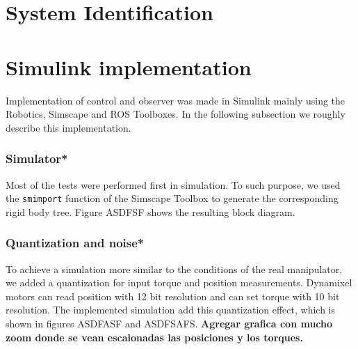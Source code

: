 \documentclass[a4paper, 10pt]{article}
\begin{document}
\section{System Identification}

\section{Simulink implementation}
Implementation of control and observer was made in Simulink mainly using the Robotics, Simscape and ROS Toolboxes. In the following subsection we roughly describe this implementation.

\subsubsection{Simulator*}
Most of the tests were performed first in simulation. To such purpose, we used the \texttt{smimport} function of the Simscape Toolbox to generate the corresponding rigid body tree. Figure ASDFSF shows the resulting block diagram. 

\subsubsection{Quantization and noise*}
To achieve a simulation more similar to the conditions of the real manipulator, we added a quantization for input torque and position measurements. Dynamixel motors can read position with 12 bit resolution and can set torque with 10 bit resolution. The implemented simulation add this quantization effect, which is shown in figures ASDFASF and ASDFSAFS. 
\textbf{Agregar grafica con mucho zoom donde se vean escalonadas las posiciones y los torques. }
\end{document}
